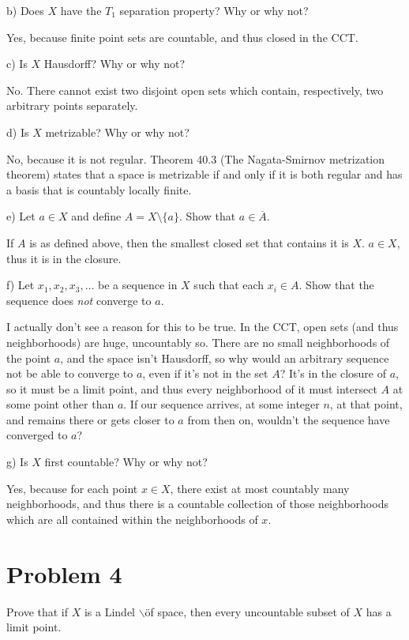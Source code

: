 \documentclass[11pt]{article}
\begin{document}
b) Does \(X\) have the \(T_1\) separation property? Why or why not?

Yes, because finite point sets are countable, and thus closed in the CCT. 

c) Is \(X\) Hausdorff? Why or why not?

No. There cannot exist two disjoint open sets which contain, respectively, two
arbitrary points separately.  

d) Is \(X\) metrizable? Why or why not?

No, because it is not regular. Theorem 40.3 (The Nagata-Smirnov metrization
theorem) states that a space is metrizable if and only if it is both regular and
has a basis that is countably locally finite. 

e) Let \(a \in X\) and define \(A = X\setminus \{a\}\). Show that \(a
\in\overline{A}\).

If \(A\) is as defined above, then the smallest closed set that contains it is \(X\).
\(a\in X\), thus it is in the closure.  

f) Let \(x_1, x_2, x_3,\ldots\) be a sequence in \(X\) such that each \(x_i\in A\).
Show that the sequence does \textit{not} converge to \(a\).

I actually don't see a reason for this to be true. In the CCT, open sets (and
thus neighborhoods) are huge, uncountably so. There are no small neighborhoods
of the point \(a\), and the space isn't Hausdorff, so why would an arbitrary
sequence not be able to converge to \(a\), even if it's not in the set \(A\)? It's
in the closure of \(a\), so it must be a limit point, and thus every neighborhood
of it must intersect \(A\) at some point other than \(a\). If our sequence arrives,
at some integer \(n\), at that point, and remains there or gets closer to \(a\) from
then on, wouldn't the sequence have converged to \(a\)?  

g) Is \(X\) first countable? Why or why not? 

Yes, because for each point \(x\in X\), there exist at most countably many
neighborhoods, and thus there is a countable collection of those neighborhoods
which are all contained within the neighborhoods of \(x\). 


\section{Problem 4}
\label{sec:org0df1a95}

Prove that if \(X\) is a Lindel $\backslash$\"of space, then every uncountable subset of \(X\) has a limit point. 
\end{document}
